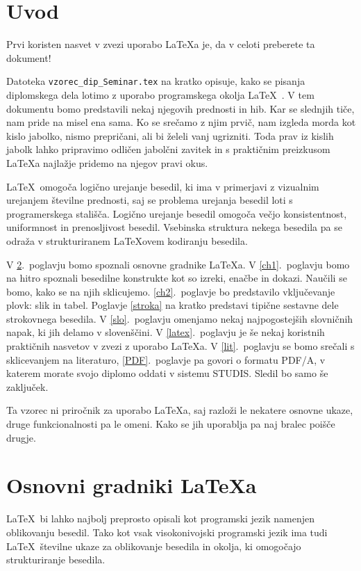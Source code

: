 \documentclass[a4paper, 12pt]{book}
\begin{document}
\chapter{Uvod}
Prvi koristen nasvet v zvezi uporabo \LaTeX{a} je, da v celoti preberete ta dokument!

Datoteka {\tt vzorec\_dip\_Seminar.tex} na kratko opisuje, kako se pisanja diplomskega dela lotimo z uporabo programskega okolja \LaTeX~\cite{lamport,nenajkrajsi}. 
V tem dokumentu bomo predstavili nekaj njegovih prednosti in hib. 
Kar se slednjih tiče, nam pride na misel ena sama. 
Ko se srečamo z njim prvič, nam izgleda morda kot kislo jabolko, nismo prepričani, ali bi želeli vanj ugrizniti. 
Toda prav iz kislih jabolk lahko pripravimo odličen jabolčni zavitek in s praktičnim preizkusom \LaTeX a najlažje pridemo na njegov pravi okus.

\LaTeX\ omogoča logično urejanje besedil, ki ima v primerjavi z vizualnim urejanjem številne prednosti, saj se problema urejanja besedil loti s programerskega stališča.
Logično urejanje besedil omogoča večjo konsistentnost, uniformnost in  prenosljivost besedil. 
Vsebinska struktura nekega besedila pa se odraža v strukturiranem \LaTeX ovem kodiranju besedila.

V \ref{ch0}.~poglavju bomo spoznali osnovne gradnike \LaTeX{a}.
V \ref{ch1}.~poglavju bomo na hitro spoznali besedilne konstrukte kot so izreki, enačbe in dokazi. 
Naučili se bomo, kako se na njih sklicujemo. 
\ref{ch2}.~poglavje bo predstavilo vključevanje plovk: slik in tabel. 
Poglavje \ref{stroka} na kratko predstavi tipične sestavne dele strokovnega besedila.
V \ref{slo}.~poglavju omenjamo nekaj najpogostejših slovničnih napak, ki jih delamo v slovenščini.
V \ref{latex}.~poglavju je še nekaj koristnih praktičnih nasvetov v zvezi z uporabo \LaTeX{a}.
V \ref{lit}.~poglavju se bomo srečali s sklicevanjem na literaturo,
\ref{PDF}.~poglavje pa govori o formatu PDF/A, v katerem morate svojo diplomo oddati v sistemu STUDIS.
Sledil bo samo še zaključek.

Ta vzorec ni priročnik za uporabo \LaTeX{a}, saj razloži le nekatere osnovne ukaze, druge funkcionalnosti pa le omeni. Kako se jih uporablja
pa naj bralec poišče drugje.


\chapter{Osnovni gradniki \LaTeX{a}}
\label{ch0}

\LaTeX\ bi lahko najbolj preprosto opisali kot programski jezik namenjen oblikovanju besedil.
Tako kot vsak visokonivojski programski jezik ima tudi \LaTeX\  številne ukaze za oblikovanje  besedila in okolja, ki omogočajo strukturiranje besedila.
\end{document}
